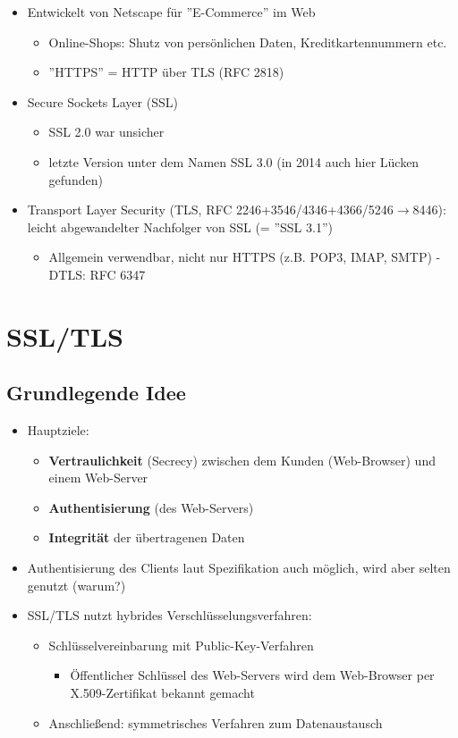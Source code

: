 \documentclass[openany]{book}
\begin{document}
\begin{itemize}
    \item Entwickelt von Netscape für ''E-Commerce'' im Web
    \begin{itemize}
        \item Online-Shops: Shutz von persönlichen Daten, Kreditkartennummern etc.
        \item ''HTTPS'' = HTTP über TLS (RFC 2818)
    \end{itemize}
    \item Secure Sockets Layer (SSL)
    \begin{itemize}
        \item SSL 2.0 war unsicher
        \item letzte Version unter dem Namen SSL 3.0 (in 2014 auch hier Lücken gefunden)
    \end{itemize}
    \item Transport Layer Security (TLS, RFC 2246+3546/4346+4366/5246$\rightarrow$8446): leicht abgewandelter Nachfolger von SSL (= ''SSL 3.1'')
    \begin{itemize}
        \item Allgemein verwendbar, nicht nur HTTPS (z.B. POP3, IMAP, SMTP) - DTLS: RFC 6347
    \end{itemize}
\end{itemize}

\section{SSL/TLS}

\subsection{Grundlegende Idee}

\begin{itemize}
    \item Hauptziele:
    \begin{itemize}
        \item \textbf{Vertraulichkeit} (Secrecy) zwischen dem Kunden (Web-Browser) und einem Web-Server
        \item \textbf{Authentisierung} (des Web-Servers)
        \item \textbf{Integrität} der übertragenen Daten
    \end{itemize}
    \item Authentisierung des Clients laut Spezifikation auch möglich, wird aber selten genutzt (warum?)
    \item SSL/TLS nutzt hybrides Verschlüsselungsverfahren:
    \begin{itemize}
        \item Schlüsselvereinbarung mit Public-Key-Verfahren
        \begin{itemize}
            \item Öffentlicher Schlüssel des Web-Servers wird dem Web-Browser per X.509-Zertifikat bekannt gemacht 
        \end{itemize}
        \item Anschließend: symmetrisches Verfahren zum Datenaustausch
    \end{itemize} 
\end{itemize}
\end{document}
